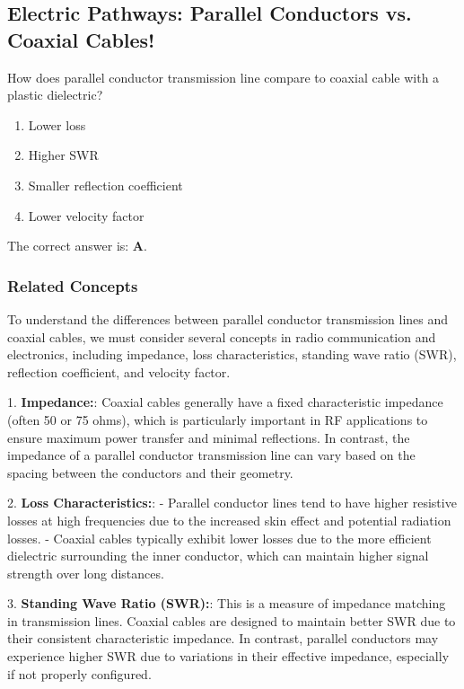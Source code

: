 \subsection{Electric Pathways: Parallel Conductors vs. Coaxial Cables!}

\begin{tcolorbox}[colback=gray!10, colframe=black, title=E9F07]
How does parallel conductor transmission line compare to coaxial cable with a plastic dielectric? 
\begin{enumerate}[label=\Alph*.]
    \item Lower loss
    \item Higher SWR
    \item Smaller reflection coefficient
    \item Lower velocity factor
\end{enumerate} \end{tcolorbox}

The correct answer is: \textbf{A}.

\subsubsection{Related Concepts}

To understand the differences between parallel conductor transmission lines and coaxial cables, we must consider several concepts in radio communication and electronics, including impedance, loss characteristics, standing wave ratio (SWR), reflection coefficient, and velocity factor.

1. \textbf{Impedance:}: Coaxial cables generally have a fixed characteristic impedance (often 50 or 75 ohms), which is particularly important in RF applications to ensure maximum power transfer and minimal reflections. In contrast, the impedance of a parallel conductor transmission line can vary based on the spacing between the conductors and their geometry.

2. \textbf{Loss Characteristics:}: 
   - Parallel conductor lines tend to have higher resistive losses at high frequencies due to the increased skin effect and potential radiation losses.
   - Coaxial cables typically exhibit lower losses due to the more efficient dielectric surrounding the inner conductor, which can maintain higher signal strength over long distances.

3. \textbf{Standing Wave Ratio (SWR):}: This is a measure of impedance matching in transmission lines. Coaxial cables are designed to maintain better SWR due to their consistent characteristic impedance. In contrast, parallel conductors may experience higher SWR due to variations in their effective impedance, especially if not properly configured.

